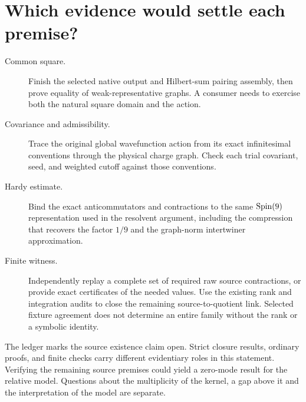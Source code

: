 \section{Which evidence would settle each premise?}
\begin{description}
 \item[Common square.] Finish the selected native output and Hilbert-sum pairing assembly, then prove equality of weak-representative graphs. A consumer needs to exercise both the natural square domain and the action.
 \item[Covariance and admissibility.] Trace the original global wavefunction action from its exact infinitesimal conventions through the physical charge graph. Check each trial covariant, seed, and weighted cutoff against those conventions.
 \item[Hardy estimate.] Bind the exact anticommutators and contractions to the same $\operatorname{Spin}(9)$ representation used in the resolvent argument, including the compression that recovers the factor $1/9$ and the graph-norm intertwiner approximation.
 \item[Finite witness.] Independently replay a complete set of required raw source contractions, or provide exact certificates of the needed values. Use the existing rank and integration audits to close the remaining source-to-quotient link. Selected fixture agreement does not determine an entire family without the rank or a symbolic identity.
\end{description}

The ledger marks the source existence claim open. Strict closure results, ordinary proofs, and finite checks carry different evidentiary roles in this statement. Verifying the remaining source premises could yield a zero-mode result for the relative model. Questions about the multiplicity of the kernel, a gap above it and the interpretation of the model are separate.

